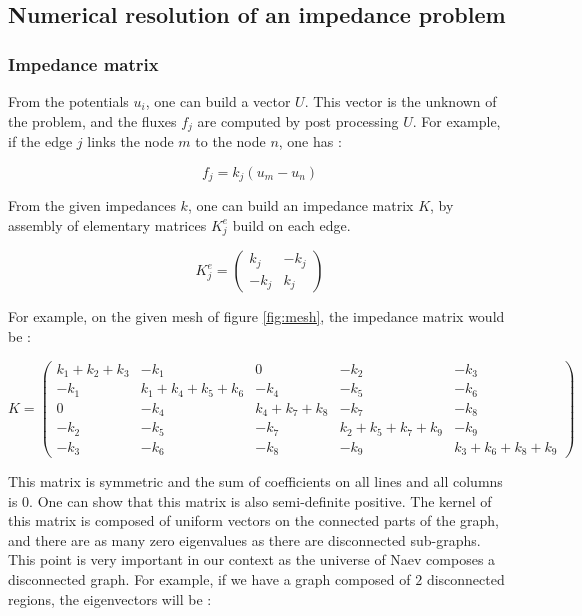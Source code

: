 \documentclass[11pt,a4paper]{article}  %
\begin{document}
\subsection{Numerical resolution of an impedance problem}

\subsubsection{Impedance matrix}

From the potentials $u_i$, one can build a vector $U$. This vector is the unknown of the problem, and the fluxes $f_j$ are computed by post processing $U$. For example, if the edge $j$ links the node $m$ to the node $n$, one has :

\begin{equation}\label{eqn:flux}
f_j = k_j(u_m-u_n)
\end{equation}

From the given impedances $k$, one can build an impedance matrix $K$, by assembly of elementary matrices $K_j^e$ build on each edge.

\begin{equation}
K_j^e = \begin{pmatrix} k_j & -k_j \\ -k_j & k_j \end{pmatrix}
\end{equation}

For example, on the given mesh of figure \ref{fig:mesh}, the impedance matrix would be :

\begin{equation}
K = \begin{pmatrix} k_1+k_2+k_3 & -k_1 & 0 & -k_2 & -k_3 \\
-k_1 & k_1+k_4+k_5+k_6 & -k_4 & -k_5 & -k_6 \\
0 & -k_4 & k_4+k_7+k_8 & -k_7 & -k_8 \\
-k_2 & -k_5 & -k_7 & k_2+k_5+k_7+k_9 & -k_9 \\
-k_3 & -k_6 & -k_8 & -k_9 & k_3+k_6+k_8+k_9 \end{pmatrix}
\end{equation}

This matrix is symmetric and the sum of coefficients on all lines and all columns is $0$. One can show that this matrix is also semi-definite positive. The kernel of this matrix is composed of uniform vectors on the connected parts of the graph, and there are as many zero eigenvalues as there are disconnected sub-graphs. This point is very important in our context as the universe of Naev composes a disconnected graph. For example, if we have a graph composed of $2$ disconnected regions, the eigenvectors will be :
\end{document}
